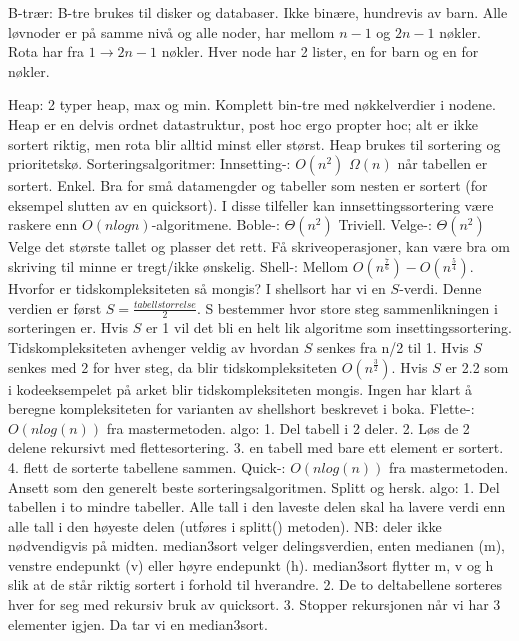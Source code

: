 \documentclass[10pt,a4paper]{article}
\begin{document}
\begin{multicols}{4}
{%
\noindent\color{red}B-trær\color{black}:
B-tre brukes til disker og databaser. Ikke binære, hundrevis av barn. Alle løvnoder er på samme nivå og alle noder, har mellom $n-1$ og $2n-1$ nøkler. Rota har fra $1 \rightarrow 2n-1$ nøkler. Hver node har 2 lister, en for barn og en for nøkler.

\noindent\color{red}Heap\color{black}:
2 typer heap, max og min. Komplett bin-tre med nøkkelverdier i nodene. Heap er en delvis ordnet datastruktur, post hoc ergo propter hoc; alt er ikke sortert riktig, men rota blir alltid minst eller størst. Heap brukes til sortering og prioritetskø. 
\noindent
\color{red}Sorteringsalgoritmer\color{black}:
\noindent
\color{red}Innsetting-\color{black}:
$O(n^2)$
$\Omega(n)$ når tabellen er sortert.
Enkel. Bra for små datamengder og tabeller som nesten er sortert (for eksempel slutten av en quicksort). I disse tilfeller kan innsettingssortering være raskere enn $O(nlogn)$-algoritmene.
\noindent
\color{red}Boble-\color{black}:
$\Theta(n^2)$
\noindent
Triviell.
\noindent
\color{red}Velge-\color{black}:
$\Theta(n^2)$
\noindent
Velge det største tallet og plasser det rett. Få skriveoperasjoner, kan være bra om skriving til minne er tregt/ikke ønskelig.
\noindent
\color{red}Shell-\color{black}:
Mellom $O(n^\frac{7}{6}) - O(n^\frac{5}{4})$. Hvorfor er tidskompleksiteten så mongis? I shellsort har vi en $S$-verdi. Denne verdien er først $S = \frac{tabellstorrelse}{2}$. S bestemmer hvor store steg sammenlikningen i sorteringen er. Hvis $S$ er 1 vil det bli en helt lik algoritme som insettingssortering. Tidskompleksiteten avhenger veldig av hvordan $S$ senkes fra n/2 til 1. Hvis $S$ senkes med 2 for hver steg, da blir tidskompleksiteten $O(n^\frac{3}{2})$. Hvis $S$ er 2.2 som i kodeeksempelet på arket blir tidskompleksiteten mongis. Ingen har klart å beregne kompleksiteten for varianten av shellshort beskrevet i boka.
\noindent
\color{red}Flette-\color{black}:
$O(nlog(n))$ fra mastermetoden.
algo: 1. Del tabell i 2 deler. 2. Løs de 2 delene rekursivt med flettesortering. 3. en tabell med bare ett element er sortert. 4. flett de sorterte tabellene sammen.
\noindent
\color{red}Quick-\color{black}:
$O(nlog(n))$ fra mastermetoden.
Ansett som den generelt beste sorteringsalgoritmen. Splitt og hersk.
algo: 1. Del tabellen i to mindre tabeller. Alle tall i den laveste delen skal ha lavere verdi enn alle tall i den høyeste delen (utføres i splitt() metoden). NB: deler ikke nødvendigvis på midten. median3sort velger delingsverdien, enten medianen (m), venstre endepunkt (v) eller høyre endepunkt (h). median3sort flytter m, v og h slik at de står riktig sortert i forhold til hverandre. 2. De to deltabellene sorteres hver for seg med rekursiv bruk av quicksort. 3. Stopper rekursjonen når vi har 3 elementer igjen. Da tar vi en median3sort.
}
\end{multicols}
\end{document}
